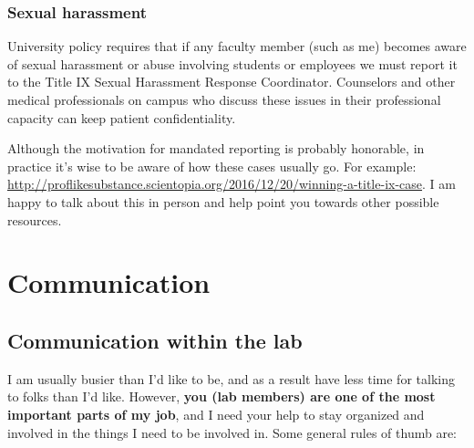 \documentclass[letterpaper,12pt,oneside]{memoir}
\begin{document}
\subsection{Sexual harassment}
University policy requires that if any faculty member (such as me) becomes aware of  sexual harassment or abuse involving students or employees we must report it to the Title IX Sexual Harassment Response Coordinator. Counselors and other medical professionals on campus who discuss these issues in their professional capacity can keep patient confidentiality.

Although the motivation for mandated reporting is probably honorable, in practice it's wise to be aware of how these cases usually go. For example: \href{http://proflikesubstance.scientopia.org/2016/12/20/winning-a-title-ix-case/}{http://proflikesubstance.scientopia.org/2016/12/20/winning-a-title-ix-case}. I am happy to talk about this in person and help point you towards other possible resources.




\chapter{Communication}
\section{Communication within the lab}
\label{sec:communicationInLab}

I am usually busier than I'd like to be, and as a result have less time for talking to folks than I'd like. However, \textbf{you (lab members) are one of the most important parts of my job}, and I need your help to stay organized and involved in the things I need to be involved in. Some general rules of thumb are:
\end{document}
